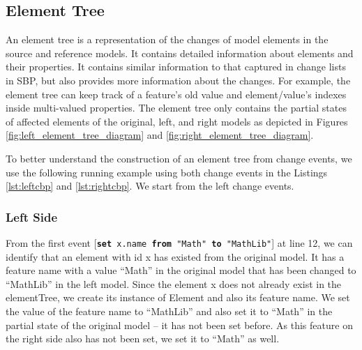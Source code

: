 \documentclass{jot}
\newcommand{\dk}[1]{\textcolor{blue}{\textbf{[Dimitris: #1]}}}
\begin{document}
    \subsection{Element Tree}
    \label{sec:tree_construction}
    An element tree is a representation of the changes of model elements in the source and reference models. It contains detailed information about elements and their properties. It contains similar information to that captured in change lists in SBP, but also provides more information about the changes. For example, the element tree can keep track of a feature's old value and element/value's indexes inside multi-valued properties. The element tree only contains the partial states of affected elements of the original, left, and right models as depicted in Figures \ref{fig:left_element_tree_diagram} and \ref{fig:right_element_tree_diagram}.
    
    To better understand the construction of an element tree from change events, we use the following running example using both change events in the Listings \ref{lst:leftcbp} and \ref{lst:rightcbp}. We start from the left change events. 
    
    \subsubsection{Left Side}\label{sec:left_side}
    
    From the first event [\texttt{\small \textbf{set} x.name \textbf{from} "Math" \textbf{to} "MathLib"}] at line 12, we can identify that an element with id \textsf{x} has existed from the original model. 
    It has a feature \textsf{name} with a value ``Math'' in the original model that has been changed to ``MathLib'' in the left model. Since the element \textsf{x} does not already exist in the \textsf{elementTree}, we create its instance of \textsf{Element} and also its feature \textsf{name}. We set the value of the feature \textsf{name} to ``MathLib'' and also set it to ``Math'' in the partial state of the original model -- it has not been set before. As this feature on the right side also has not been set, we set it to ``Math'' as well. 
    
\end{document}
